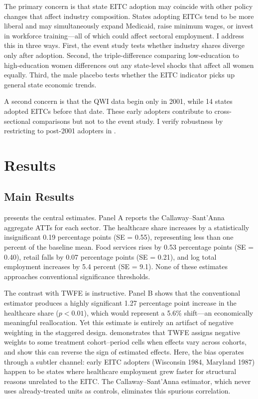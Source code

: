 \documentclass[12pt]{article}
\begin{document}
The primary concern is that state EITC adoption may coincide with other policy changes that affect industry composition. States adopting EITCs tend to be more liberal and may simultaneously expand Medicaid, raise minimum wages, or invest in workforce training---all of which could affect sectoral employment. I address this in three ways. First, the event study tests whether industry shares diverge only after adoption. Second, the triple-difference comparing low-education to high-education women differences out any state-level shocks that affect all women equally. Third, the male placebo tests whether the EITC indicator picks up general state economic trends.

A second concern is that the QWI data begin only in 2001, while 14 states adopted EITCs before that date. These early adopters contribute to cross-sectional comparisons but not to the event study. I verify robustness by restricting to post-2001 adopters in .


\section{Results}

\subsection{Main Results}



 presents the central estimates. Panel A reports the Callaway--Sant'Anna aggregate ATTs for each sector. The healthcare share increases by a statistically insignificant 0.19 percentage points (SE = 0.55), representing less than one percent of the baseline mean. Food services rises by 0.53 percentage points (SE = 0.40), retail falls by 0.07 percentage points (SE = 0.21), and log total employment increases by 5.4 percent (SE = 9.1). None of these estimates approaches conventional significance thresholds.

The contrast with TWFE is instructive. Panel B shows that the conventional estimator produces a highly significant 1.27 percentage point increase in the healthcare share ($p < 0.01$), which would represent a 5.6\% shift---an economically meaningful reallocation. Yet this estimate is entirely an artifact of negative weighting in the staggered design. \citet{goodman2021} demonstrates that TWFE assigns negative weights to some treatment cohort--period cells when effects vary across cohorts, and \citet{dechaisemartin2020} show this can reverse the sign of estimated effects. Here, the bias operates through a subtler channel: early EITC adopters (Wisconsin 1984, Maryland 1987) happen to be states where healthcare employment grew faster for structural reasons unrelated to the EITC. The Callaway--Sant'Anna estimator, which never uses already-treated units as controls, eliminates this spurious correlation.
\end{document}
